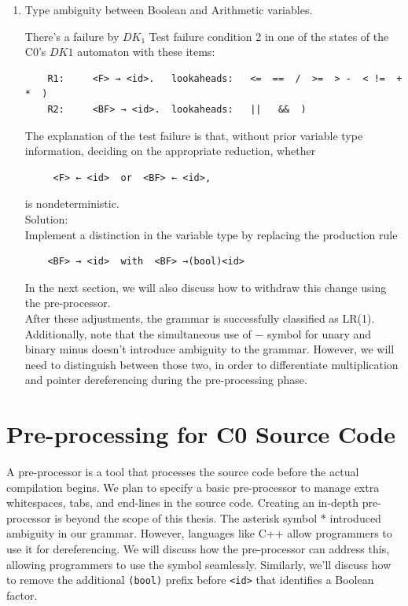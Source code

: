 \begin{enumerate}
    \item Type ambiguity between Boolean and Arithmetic variables.

    There’s a failure by \({DK_{1}}\) Test failure condition 2 in one of the states of the C0's \(DK1\) automaton with these items:
    \begin{verbatim}
    R1:		<F> → <id>.   lookaheads:   <=  ==  /  >=  > -  < !=  +  *  )
    R2:		<BF> → <id>.  lookaheads:   ||   &&  )
    \end{verbatim}
    The explanation of the test failure is that, without prior variable type information, deciding on the appropriate reduction, whether
    \begin{verbatim}
     <F> ← <id>  or  <BF> ← <id>,
    \end{verbatim}
    is nondeterministic.\\

    Solution: \\
    Implement a distinction in the variable type by replacing the production rule
    \begin{verbatim}
    <BF> → <id>  with  <BF> →(bool)<id>
    \end{verbatim}

    In the next section, we will also discuss how to withdraw this change using the pre-processor.\\

    After these adjustments, the grammar is successfully classified as LR(1). Additionally, note that the simultaneous use of \(-\) symbol for unary and binary minus doesn’t introduce ambiguity to the grammar. However, we will need to distinguish between those two, in order to differentiate multiplication and pointer dereferencing during the pre-processing phase.
\end{enumerate}


\newpage


\section{Pre-processing for C0 Source Code}\label{sec:Pre-processing for C0 Source Code}

A pre-processor is a tool that processes the source code before the actual compilation begins. We plan to specify a basic pre-processor to manage extra whitespaces, tabs, and end-lines in the source code. Creating an in-depth pre-processor is beyond the scope of this thesis. The asterisk symbol \(\ast\) introduced ambiguity in our grammar. However, languages like C++ allow programmers to use it for dereferencing. We will discuss how the pre-processor can address this, allowing programmers to use the symbol seamlessly. Similarly, we'll discuss how to remove the additional \texttt{(bool)} prefix before \texttt{<id>} that identifies a Boolean factor.

